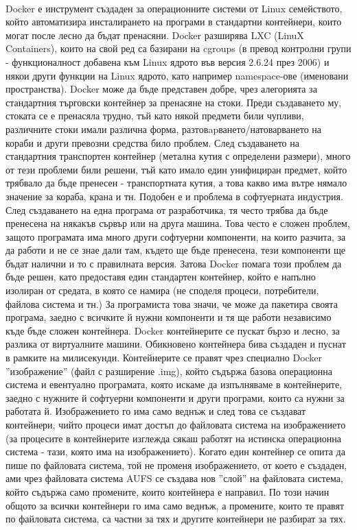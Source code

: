 \documentclass[pdftex,14pt,a4paper]{extreport}
\begin{document}
\paragraph {}
Docker е инструмент създаден за операционните системи от Linux семейството, който автоматизира инсталирането на програми в стандартни контейнери, които могат после лесно да бъдат пренасяни. Docker разширява LXC (LinuX Containers), които на свой ред са базирани на cgroups (в превод контролни групи - функционалност добавена към Linux ядрото във версия 2.6.24 през 2006) и някои други функции на Linux ядрото, като например namespace-ове (именовани пространства). Docker може да бъде представен добре, чрез алегорията за стандартния търговски контейнер за пренасяне на стоки. Преди създаването му, стоката се е пренасяла трудно, тъй като някой предмети били чупливи, различните стоки имали различна форма, разтовapването/натоварването на кораби и други превозни средства било проблем. След създаването на стандартния транспортен контейнер (метална кутия с определени размери), много от тези проблеми били решени, тъй като имало един унифициран предмет, който трябвало да бъде пренесен - транспортната кутия, а това какво има вътре нямало значение за кораба, крана и тн. Подобен е и проблема в софтуерната индустрия. След създаването на една програма от разработчика, тя често трябва да бъде пренесена на някакъв сървър или на друга машина. Това често е сложен проблем, защото програмата има много други софтуерни компоненти, на които разчита, за да работи и не се знае дали там, където ще бъде пренесена, тези компоненти ще бъдат налични и то с правилната версия. Затова Docker помага този проблем да бъде решен, като предоставя един стандартен контейнер, който е напълно изолиран от средата, в която се намира (не споделя процеси, потребители, файлова система и тн.) За програмиста това значи, че може да пакетира своята програма, заедно с всичките й нужни компоненти и тя ще работи независимо къде бъде сложен контейнера. Docker контейнерите се пускат бързо и лесно, за разлика от виртуалните машини. Обикновено контейнера бива създаден и пуснат в рамките на милисекунди. Контейнерите се правят чрез специално Docker ''изображение'' (файл с разширение .img), който съдържа базова операционна система и евентуално програмата, която искаме да изпълняваме в контейнерите, заедно с нужните й софтуерни компоненти и други програми, които са нужни за работата й. Изображението го има само веднъж и след това се създават контейнери, чийто процеси имат достъп до файловата система на изображението (за процесите в контейнерите изглежда сякаш работят на истинска операционна система - тази, която има на изображението). Когато един контейнер се опита да пише по файловата система, той не променя изображението, от което е създаден, ами чрез файловата система AUFS се създава нов ''слой'' на файловата система, който съдържа само промените, които контейнера е направил. По този начин общото за всички контейнери го има само веднъж, а промените, които те правят по файловата система, са частни за тях и другите контейнери не разбират за тях. 
\end{document}
